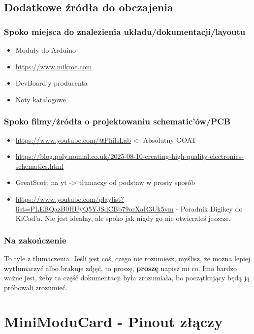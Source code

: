 \documentclass[b5paper, 10pt, twoside]{book}
\begin{document}
\begin{itemize}
\end{itemize}

\subsection{Dodatkowe źródła do obczajenia}

\subsubsection{Spoko miejsca do znalezienia układu/dokumentacji/layoutu}
\begin{itemize}
  \item Moduły do Arduino
  \item \url{https://www.mikroe.com}
  \item DevBoard'y producenta
  \item Noty katalogowe
\end{itemize}

\subsubsection{Spoko filmy/źródła o projektowaniu schematic'ów/PCB}
\begin{itemize}
  \item \url{https://www.youtube.com/@PhilsLab} <- Absolutny GOAT
  \item \url{https://blog.poly.nomial.co.uk/2025-08-10-creating-high-quality-electronics-schematics.html}
  \item GreatScott na yt -> tłumaczy od podstaw w prosty sposób
  \item \url{https://www.youtube.com/playlist?list=PLEBQazB0HUyQ5YJSdCBb79orXaR3Uk5vm} - Poradnik Digikey do KiCad'a. Nie jest idealny, ale spoko jak nigdy go nie otwierałeś jeszcze.
\end{itemize}

\subsubsection{Na zakończenie}
To tyle z tłumaczenia. Jeśli jest coś, czego nie rozumiesz, myślisz, że można lepiej wytłumaczyć albo brakuje zdjęć, to proszę, \textbf{proszę} napisz mi co. Imo bardzo ważne jest, żeby ta część dokumentacji była zrozumiała, bo początkujący będą ją próbowali zrozumieć.

\section{MiniModuCard - Pinout złączy}
\end{document}
